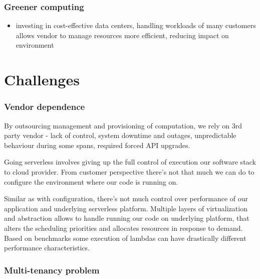 
\subsubsection*{Greener computing}

\begin{itemize}
    \item investing in cost-effective data centers, handling workloads of many customers allows vendor to manage resources more efficient, reducing impact on environment
\end{itemize}

\section*{Challenges}

\subsubsection*{Vendor dependence}

By outsourcing management and provisioning of computation, we rely on 3rd party vendor - lack of control, system downtime and outages, unpredictable behaviour during some spans, required forced API upgrades. 

Going serverless involves giving up the full control of execution our software stack to cloud provider. From customer perspective there's not that much we can do to configure the environment where our code is running on. 

Similar as with configuration, there's not much control over performance of our application and underlying serverless platform. Multiple layers of virtualization and abstraction allows to handle running our code on underlying platform, that alters the scheduling priorities and allocates resources in response to demand. Based on benchmarks some execution of lambdas can have drastically different performance characteristics. 

\subsubsection*{Multi-tenancy problem}

